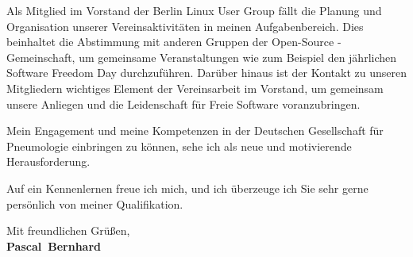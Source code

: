 \documentclass[11pt,a4paper]{article}
\def\firstname{Pascal}
\def\familyname{Bernhard}
\begin{document}
Als Mitglied im Vorstand der Berlin Linux User Group fällt die Planung und Organisation unserer Vereinsaktivitäten in meinen Aufgabenbereich. Dies beinhaltet die Abstimmung mit anderen Gruppen der Open-Source - Gemeinschaft, um gemeinsame Veranstaltungen wie zum Beispiel den jährlichen Software Freedom Day durchzuführen. Darüber hinaus ist der Kontakt zu unseren Mitgliedern wichtiges Element der Vereinsarbeit im Vorstand, um gemeinsam unsere Anliegen und die Leidenschaft für Freie Software voranzubringen.

Mein Engagement und meine Kompetenzen in der Deutschen Gesellschaft für Pneumologie einbringen zu können, sehe ich als neue und motivierende Herausforderung.

Auf ein Kennenlernen freue ich mich, und ich überzeuge ich Sie sehr gerne persönlich von meiner Qualifikation.

Mit freundlichen Grüßen,\\[3em] %
%
{\bfseries \firstname~\familyname}\\
%
\end{document}
